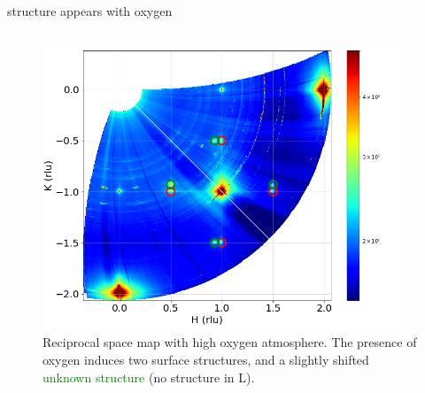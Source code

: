 \begin{frame}{\ptthreeofour structure appears with oxygen}
\begin{columns}
    
    \begin{figure}
        \centering
        \includegraphics[trim=0 0 40 0, clip, width=0.95\textwidth]{Figures/sxrd_data/maps/Map_hkl_surf_or_1596-1635.png}
        \caption{Reciprocal space map with high oxygen atmosphere. The presence of oxygen induces two surface structures, \ptthreeofour and a slightly shifted \textcolor{green}{unknown structure} (no structure in L).}
        \label{fig:CondF1}
    \end{figure}

    \end{columns}

\end{frame}